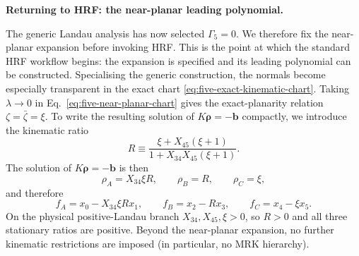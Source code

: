 \documentclass[a4paper,11pt]{article}
\begin{document}
\medskip
\noindent\textbf{Returning to HRF: the near-planar leading polynomial.}\par\smallskip

The generic Landau analysis has now selected \(\Gamma_5=0\).  We therefore
fix the near-planar expansion before invoking HRF.  This is the point at which
the standard HRF workflow begins: the expansion is specified and its leading
polynomial can be constructed.  Specialising the generic construction, the
normals become especially transparent in the exact chart
\eqref{eq:five-exact-kinematic-chart}.  Taking \(\lambda\to0\) in
Eq.~\eqref{eq:five-near-planar-chart} gives the exact-planarity relation
\(\zeta=\bar\zeta=\xi\).  To write the resulting solution of
\(K\boldsymbol\rho=-\boldsymbol b\) compactly, we introduce the kinematic
ratio
\begin{equation}
 R\equiv\frac{\xi+X_{45}(\xi+1)}
       {1+X_{34}X_{45}(\xi+1)}.
 \label{eq:five-near-planar-ratio-variables}
\end{equation}
The solution of \(K\boldsymbol\rho=-\boldsymbol b\) is then
\begin{equation}
 \rho_A=X_{34}\xi R,\qquad
 \rho_B=R,\qquad \rho_C=\xi,
 \label{eq:five-near-planar-rhos}
\end{equation}
and therefore
\begin{equation}
 f_A=x_0-X_{34}\xi R x_1,\qquad
 f_B=x_2-Rx_3,\qquad
 f_C=x_4-\xi x_5.
 \label{eq:five-near-planar-factors}
\end{equation}
On the physical positive-Landau branch
\(X_{34},X_{45},\xi>0\), so \(R>0\) and all three stationary ratios are
positive.  Beyond the near-planar expansion, no further kinematic restrictions
are imposed (in particular, no MRK hierarchy).
\end{document}
